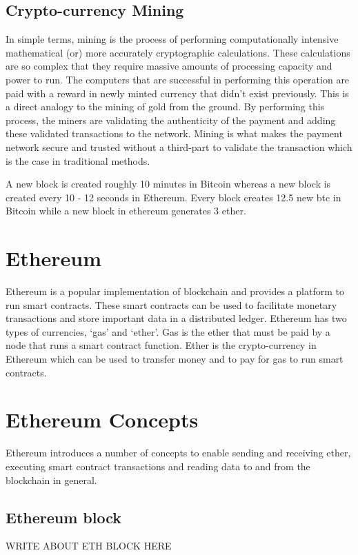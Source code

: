 \documentclass[11pt,openright]{report}
\begin{document}
\subsection{Crypto-currency Mining}
In simple terms, mining is the process of performing computationally intensive mathematical (or) more accurately cryptographic calculations. These calculations are so complex that they require massive amounts of processing capacity and power to run. The computers that are successful in performing this operation are paid with a reward in newly minted currency that didn't exist previously. This is a direct analogy to the mining of gold from the ground. By performing this process, the miners are validating the authenticity of the payment and adding these validated transactions to the network. Mining is what makes the payment network secure and trusted without a third-part to validate the transaction which is the case in traditional methods.

A new block is created roughly 10 minutes in Bitcoin whereas a new block is created every 10 - 12 seconds in Ethereum. Every block creates 12.5 new btc in Bitcoin while a new block in ethereum generates 3 ether.

\section{Ethereum}
Ethereum is a popular implementation of blockchain and provides a platform to run smart contracts. These smart contracts can be used to facilitate monetary transactions and store important data in a distributed ledger. Ethereum has two types of currencies, ‘gas’ and ‘ether’. Gas is the ether that must be paid by a node that runs a smart contract function. Ether is the crypto-currency in Ethereum which can be used to transfer money and to pay for gas to run smart contracts.

\section{Ethereum Concepts}
Ethereum introduces a number of concepts to enable sending and receiving ether, executing smart contract transactions and reading data to and from the blockchain in general.

\subsection{Ethereum block}
WRITE ABOUT ETH BLOCK HERE
\end{document}
